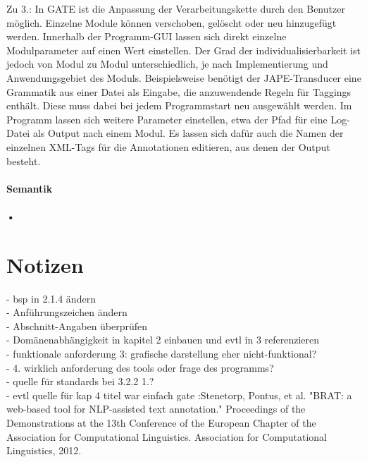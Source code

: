 \documentclass[12pt]{report}
\begin{document}
Zu 3.: In GATE ist die Anpassung der Verarbeitungskette durch den Benutzer möglich. Einzelne Module können verschoben, gelöscht oder neu hinzugefügt werden. Innerhalb der Programm-GUI lassen sich direkt einzelne Modulparameter auf einen Wert einstellen. Der Grad der individualisierbarkeit ist jedoch von Modul zu Modul unterschiedlich, je nach Implementierung und Anwendungsgebiet des Moduls. Beispielsweise benötigt der JAPE-Transducer eine Grammatik aus einer Datei als Eingabe, die anzuwendende Regeln für Taggings enthält. Diese muss dabei bei jedem Programmstart neu ausgewählt werden.
Im Programm lassen sich weitere Parameter einstellen, etwa der Pfad für eine Log-Datei als Output nach einem Modul. Es lassen sich dafür auch die Namen der einzelnen XML-Tags für die Annotationen editieren, aus denen der Output besteht.
 


\subsubsection{Semantik}
\subsubsection{•}

\chapter{Notizen}
- bsp in 2.1.4 ändern\\
- Anführungszeichen ändern\\
- Abschnitt-Angaben überprüfen\\
- Domänenabhängigkeit in kapitel 2 einbauen und evtl in 3 referenzieren\\
- funktionale anforderung 3: grafische darstellung eher nicht-funktional?\\
- 4. wirklich anforderung des tools oder frage des programms?\\
- quelle für standards bei 3.2.2 1.?\\
- evtl quelle für kap 4 titel war einfach gate :Stenetorp, Pontus, et al. "BRAT: a web-based tool for NLP-assisted text annotation." Proceedings of the Demonstrations at the 13th Conference of the European Chapter of the Association for Computational Linguistics. Association for Computational Linguistics, 2012.\\
\end{document}
